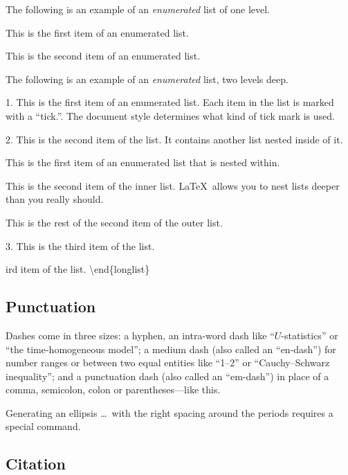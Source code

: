 \documentclass[aoas]{imsart}
\numberwithin{equation}{section}
\theoremstyle{plain}
\theoremstyle{remark}
\begin{document}
The following is an example of an \emph{enumerated} list of one level.

\begin{longlist}
\item This is the first item of an enumerated list.
\item This is the second item of an enumerated list.
\end{longlist}

The following is an example of an \emph{enumerated} list, two levels
deep.

\begin{longlist}
\item[1.]
This is the first item of an enumerated list.  Each item
in the list is marked with a ``tick.''.  The document
style determines what kind of tick mark is used.
\item[2.]
This is the second item of the list.  It contains another
list nested inside of it.
\begin{longlist}
\item
This is the first item of an enumerated list that
is nested within.  
\item
This is the second item of the inner list.  \LaTeX\
allows you to nest lists deeper than you really should.
\end{longlist}
This is the rest of the second item of the outer list.
\item[3.]
This is the third item of the list.
\end{longlist}

ird item of the list. \textbackslash end\{longlist\}

\hypertarget{punctuation}{%
\subsection{Punctuation}\label{punctuation}}

Dashes come in three sizes: a hyphen, an intra-word dash like
``\(U\)-statistics'' or ``the time-homogeneous model''; a medium dash
(also called an ``en-dash'') for number ranges or between two equal
entities like ``1--2'' or ``Cauchy--Schwarz inequality''; and a
punctuation dash (also called an ``em-dash'') in place of a comma,
semicolon, colon or parentheses---like this.

Generating an ellipsis \ldots~with the right spacing around the periods
requires a special command.

\hypertarget{citation}{%
\subsection{Citation}\label{citation}}
\end{document}
